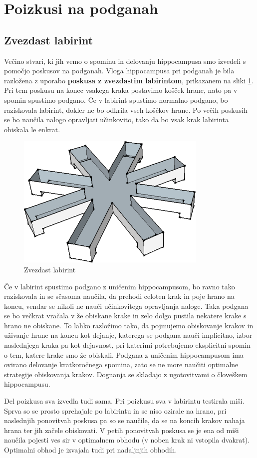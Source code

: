 \documentclass[10pt,a4paper]{article}
\begin{document}
\section{Poizkusi na podganah}
\subsection{Zvezdast labirint}
Večino stvari, ki jih vemo o spominu in delovanju hippocampusa smo izvedeli s pomočjo poskusov na podganah. Vloga hippocampusa pri podganah je bila razložena z uporabo \textbf{poskusa z zvezdastim labirintom}, prikazanem na sliki \ref{slikaLabirinta}. Pri tem poskusu na konec vsakega kraka postavimo košček hrane, nato pa v spomin spustimo podgano. Če v labirint spustimo normalno podgano, bo raziskovala labirint, dokler ne bo odkrila vseh koščkov hrane. Po večih poskusih se bo naučila nalogo opravljati učinkovito, tako da bo vsak krak labirinta obiskala le enkrat.

\begin{figure}[h]
  \centering
    \includegraphics[width=.5\textwidth]{Labirint.png}
  \caption{Zvezdast labirint}
  \label{slikaLabirinta}
\end{figure}

Če v labirint spustimo podgano z uničenim hippocampusom, bo ravno tako raziskovala in se sčasoma naučila, da prehodi celoten krak in poje hrano na koncu, vendar se nikoli ne nauči učinkovitega opravljanja naloge. Taka podgana se bo večkrat vračala v že obiskane krake in zelo dolgo pustila nekatere krake s hrano ne obiskane. To lahko razložimo tako, da pojmujemo obiskovanje krakov in uživanje hrane na koncu kot dejanje, katerega se podgana nauči implicitno, izbor naslednjega kraka pa kot dejavnost, pri katerimi potrebujemo eksplicitni spomin o tem, katere krake smo že obiskali. Podgana z uničenim hippocampusom ima ovirano delovanje kratkoročnega spomina, zato se ne more naučiti optimalne strategije obiskovanja krakov. Dognanja se skladajo z ugotovitvami o človeškem hippocampusu.

Del poizkusa sva izvedla tudi sama. Pri poizkusu sva v labirintu testirala miši. Sprva so se prosto sprehajale po labirintu in se niso ozirale na hrano, pri naslednjih ponovitvah poskusa pa so se naučile, da se na koncih krakov nahaja hrana ter jih začele obiskovati. V petih ponovitvah poskusa se je ena od miši naučila pojesti ves sir v optimalnem obhodu (v noben krak ni vstopila dvakrat). Optimalni obhod je izvajala tudi pri nadaljnjih obhodih.
\end{document}
